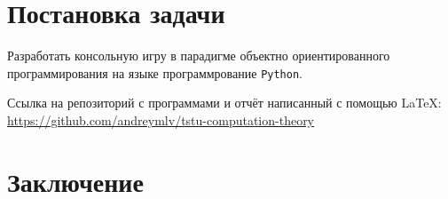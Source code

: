 \section*{Постановка задачи}
Разработать консольную игру в парадигме объектно ориентированного
программирования на языке программрование \verb|Python|.

Ссылка на репозиторий с программами и отчёт написанный с помощью \LaTeX:
\url{https://github.com/andreymlv/tstu-computation-theory}

\section*{Заключение}
